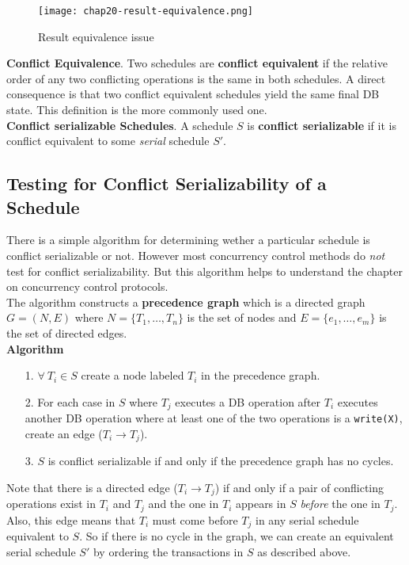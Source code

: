 \begin{figure}
    \centering
    \texttt{[image: chap20-result-equivalence.png]}
    \caption{Result equivalence issue}
    \label{fig:chap20-result-equivalence}
\end{figure}

\textbf{Conflict Equivalence}. Two schedules are \textbf{conflict equivalent} if the relative order of any two conflicting operations is the same in both schedules. A direct consequence is that two conflict equivalent schedules yield the same final DB state. This definition is the more commonly used one. \\

\textbf{Conflict serializable Schedules}. A schedule $S$ is \textbf{conflict serializable} if it is conflict equivalent to some \textit{serial} schedule $S'$.


\subsection{Testing for Conflict Serializability of a Schedule}
There is a simple algorithm for determining wether a particular schedule is conflict serializable or not. However most concurrency control methods do \textit{not} test for conflict serializability. But this algorithm helps to understand the chapter on concurrency control protocols.\\

The algorithm constructs a \textbf{precedence graph} which is a directed graph $G=(N,E)$ where $N = \{T_1,\dots,T_n\}$ is the set of nodes and $E=\{e_1,\dots,e_m\}$ is the set of directed edges. \\

\textbf{Algorithm}
\begin{itemize}
    \item[1.] $\forall~T_i \in S$ create a node labeled $T_i$ in the precedence graph.
    \item[2.] For each case in $S$ where $T_j$ executes a DB operation after $T_i$ executes another DB operation where at least one of the two operations is a \texttt{write(X)}, create an edge ($T_i \rightarrow T_j$).
    \item[3.] $S$ is conflict serializable if and only if the precedence graph has no cycles.
\end{itemize}

Note that there is a directed edge ($T_i \rightarrow T_j$) if and only if a pair of conflicting operations exist in $T_i$ and $T_j$ and the one in $T_i$ appears in $S$ \textit{before} the one in $T_j$. Also, this edge means that $T_i$ must come before $T_j$ in any serial schedule equivalent to $S$. So if there is no cycle in the graph, we can create an equivalent serial schedule $S'$ by ordering the transactions in $S$ as described above.

